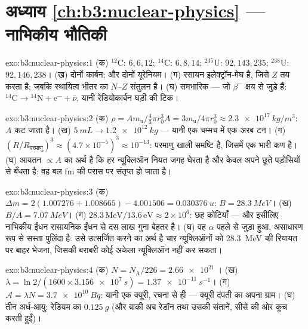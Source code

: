 \section*{अध्याय \ref{ch:b3:nuclear-physics} --- नाभिकीय भौतिकी}

\begin{solution}{exo:b3:nuclear-physics:1}
(क) $^{12}$C: $6, 6, 12$; $^{14}$C: $6, 8, 14$; $^{235}$U:
$92, 143, 235$; $^{238}$U: $92, 146, 238$। (ख) दोनों कार्बन; और
दोनों यूरेनियम। (ग) रसायन इलेक्ट्रॉन-मेघ है, जिसे $Z$ तय करता है;
जबकि स्थायित्व भीतर का $N$--$Z$ संतुलन है। (घ) समभारिक ---
जो $\beta^-$ क्षय से जुड़े हैं: $^{14}\text{C} \to {}^{14}\text{N}
+ \text{e}^- + \bar\nu$, यानी रेडियोकार्बन घड़ी की टिक।
\end{solution}

\begin{solution}{exo:b3:nuclear-physics:2}
(क) $\rho = Am_{\text{u}}/\tfrac43\pi r_0^3A =
3m_{\text{u}}/4\pi r_0^3 \approx \qty{2.3e17}{kg/m^3}$: $A$
कट जाता है। (ख) $\qty{5}{mL} \to \qty{1.2e12}{kg}$ --- यानी एक
चम्मच में एक अरब टन। (ग) $(R/R_{\text{परमाणु}})^3 \approx
(4.7\times10^{-5})^3 \approx 10^{-13}$: परमाणु खाली समष्टि है,
जिसमें एक भारी कण है। (घ) आयतन $\propto A$ का अर्थ है कि हर
न्यूक्लिऑन नियत जगह घेरता है और केवल अपने छूते पड़ोसियों से बँधता है:
वह बल \unit{fm} की परास पर संतृप्त हो जाता है।
\end{solution}

\begin{solution}{exo:b3:nuclear-physics:3}
(क) $\Delta m = 2(1.007276 + 1.008665) - 4.001506 =
\qty{0.030376}{u}$: $B = \qty{28.3}{MeV}$। (ख) $B/A =
\qty{7.07}{MeV}$। (ग) $28.3\,\text{MeV}/13.6\,\text{eV} \approx
2\times10^6$: छह कोटियाँ --- और इसीलिए नाभिकीय ईंधन रासायनिक ईंधन से
दस लाख गुना बेहतर है। (घ) वह $\alpha$ पहले से जुड़ा हुआ, असाधारण रूप
से सस्ता पुलिंदा है: उसे उत्सर्जित करने का अर्थ है चार न्यूक्लिऑनों को
\qty{28.3}{MeV} की रियायत पर बाहर भेजना, जिसकी बराबरी कोई अकेला
न्यूक्लिऑन नहीं कर सकता।
\end{solution}

\begin{solution}{exo:b3:nuclear-physics:4}
(क) $N = N_{\text{A}}/226 = \qty{2.66e21}{}$। (ख) $\lambda =
\ln2/(1600\times\qty{3.156e7}{s}) = \qty{1.37e-11}{s^{-1}}$। (ग)
$\mathcal A = \lambda N = \qty{3.7e10}{Bq}$: यानी एक क्यूरी, रचना से
ही --- क्यूरी दंपती का अपना ग्राम। (घ) तीन अर्ध-आयु:
रेडियम का $\qty{0.125}{g}$ (और बाकी अब रेडॉन तथा उसकी संतानें, सीसे
की ओर कूच करती हुईं)।
\end{solution}

